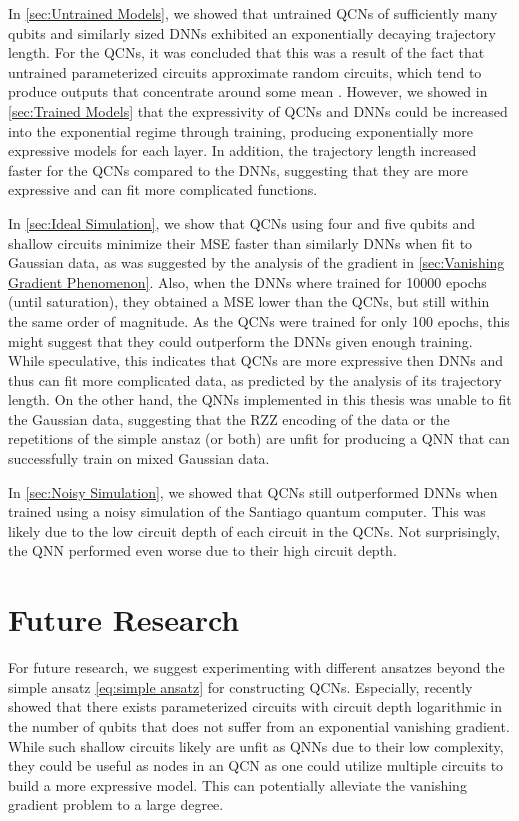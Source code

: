 In \autoref{sec:Untrained Models}, we showed that untrained QCNs of sufficiently many qubits and similarly sized DNNs exhibited an exponentially decaying trajectory length. For the QCNs, it was concluded that this was a result of the fact that untrained parameterized circuits approximate random circuits, which tend to produce outputs that concentrate around some mean \cite{McClean_2018}. However, we showed in \autoref{sec:Trained Models} that the expressivity of QCNs and DNNs could be increased into the exponential regime through training, producing exponentially more expressive models for each layer. In addition, the trajectory length increased faster for the QCNs compared to the DNNs, suggesting that they are more expressive and can fit more complicated functions.

In \autoref{sec:Ideal Simulation}, we show that QCNs using four and five qubits and shallow circuits minimize their MSE faster than similarly DNNs when fit to Gaussian data, as was suggested by the analysis of the gradient in \autoref{sec:Vanishing Gradient Phenomenon}. Also, when the DNNs where trained for 10000 epochs (until saturation), they obtained a MSE lower than the QCNs, but still within the same order of magnitude. As the QCNs were trained for only 100 epochs, this might suggest that they could outperform the DNNs given enough training. While speculative, this indicates that QCNs are more expressive then DNNs and thus can fit more complicated data, as predicted by the analysis of its trajectory length. On the other hand, the QNNs implemented in this thesis was unable to fit the Gaussian data, suggesting that the RZZ encoding of the data or the repetitions of the simple anstaz (or both) are unfit for producing a QNN that can successfully train on mixed Gaussian data. 

In \autoref{sec:Noisy Simulation}, we showed that QCNs still outperformed DNNs when trained using a noisy simulation of the Santiago quantum computer. This was likely due to the low circuit depth of each circuit in the QCNs. Not surprisingly, the QNN performed even worse due to their high circuit depth.   



\section{Future Research}\label{sec:future}
For future research, we suggest experimenting with different ansatzes beyond the simple ansatz \autoref{eq:simple ansatz} for constructing QCNs. Especially, \citet{Cerezo_2021} recently showed that there exists parameterized circuits with circuit depth logarithmic in the number of qubits that does not suffer from an exponential vanishing gradient. While such shallow circuits likely are unfit as QNNs due to their low complexity, they could be useful as nodes in an QCN as one could utilize multiple circuits to build a more expressive model. This can potentially alleviate the vanishing gradient problem to a large degree.

